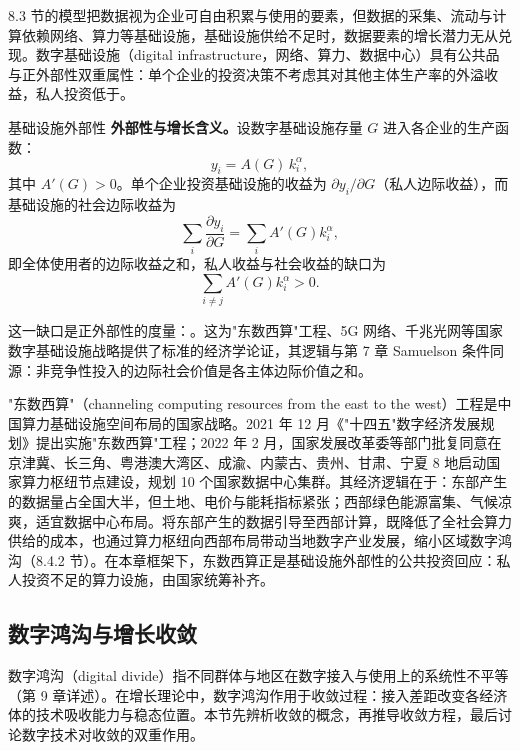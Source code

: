8.3 节的模型把数据视为企业可自由积累与使用的要素，但数据的采集、流动与计算依赖网络、算力等基础设施，基础设施供给不足时，数据要素的增长潜力无从兑现。数字基础设施（digital infrastructure，网络、算力、数据中心）具有公共品与正外部性双重属性：单个企业的投资决策不考虑其对其他主体生产率的外溢收益，私人投资低于。

\begin{derivation}{基础设施外部性}{}
\textbf{外部性与增长含义。}设数字基础设施存量 $G$ 进入各企业的生产函数：
\[
y_i = A(G)\, k_i^\alpha,
\]
其中 $A'(G) > 0$。单个企业投资基础设施的收益为 $\partial y_i/\partial G$（私人边际收益），而基础设施的社会边际收益为
\[
\sum_i \frac{\partial y_i}{\partial G} = \sum_i A'(G) k_i^\alpha,
\]
即全体使用者的边际收益之和，私人收益与社会收益的缺口为
\[
\sum_{i \neq j} A'(G) k_i^\alpha > 0.
\]
\end{derivation}

这一缺口是正外部性的度量：。这为"东数西算"工程、5G 网络、千兆光网等国家数字基础设施战略提供了标准的经济学论证，其逻辑与第 7 章 Samuelson 条件同源：非竞争性投入的边际社会价值是各主体边际价值之和。

\begin{case}[东数西算]
"东数西算"（channeling computing resources from the east to the west）工程是中国算力基础设施空间布局的国家战略。2021 年 12 月《"十四五"数字经济发展规划》提出实施"东数西算"工程；2022 年 2 月，国家发展改革委等部门批复同意在京津冀、长三角、粤港澳大湾区、成渝、内蒙古、贵州、甘肃、宁夏 8 地启动国家算力枢纽节点建设，规划 10 个国家数据中心集群。其经济逻辑在于：东部产生的数据量占全国大半，但土地、电价与能耗指标紧张；西部绿色能源富集、气候凉爽，适宜数据中心布局。将东部产生的数据引导至西部计算，既降低了全社会算力供给的成本，也通过算力枢纽向西部布局带动当地数字产业发展，缩小区域数字鸿沟（8.4.2 节）。在本章框架下，东数西算正是基础设施外部性的公共投资回应：私人投资不足的算力设施，由国家统筹补齐。
\end{case}

\subsection{数字鸿沟与增长收敛}

数字鸿沟（digital divide）指不同群体与地区在数字接入与使用上的系统性不平等（第 9 章详述）。在增长理论中，数字鸿沟作用于收敛过程：接入差距改变各经济体的技术吸收能力与稳态位置。本节先辨析收敛的概念，再推导收敛方程，最后讨论数字技术对收敛的双重作用。

